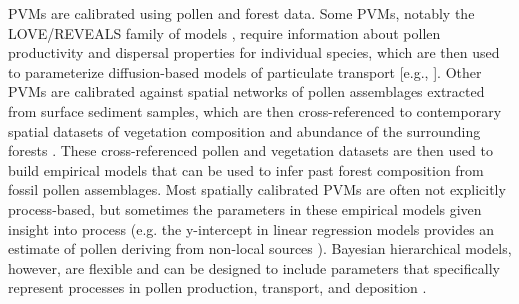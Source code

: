 \documentclass[12pt]{article}
\begin{document}


PVMs are calibrated using pollen and forest data. Some PVMs, notably
the LOVE/REVEALS family of models \citep{sugita2007theory1,
  sugita2007theory2}, require information about pollen productivity
and dispersal properties for individual species, which are then used
to parameterize diffusion-based models of particulate transport [e.g.,
  \citet{prentice1985pollen}]. Other PVMs are calibrated against
spatial networks of pollen assemblages extracted from surface sediment
samples, which are then cross-referenced to contemporary spatial
datasets of vegetation composition and abundance of the surrounding
forests \citep{sugita2007theory1, sugita2007theory2}. These
cross-referenced pollen and vegetation datasets are then used to build
empirical models that can be used to infer past forest composition
from fossil pollen assemblages. Most spatially calibrated PVMs are
often not explicitly process-based, but sometimes the parameters in
these empirical models given insight into process (e.g. the
y-intercept in linear regression models provides an estimate of pollen
deriving from non-local sources \citep{howe1983calibrating}).
Bayesian hierarchical models, however, are flexible and can be
designed to include parameters that specifically represent processes
in pollen production, transport, and deposition
\citep{paciorek2009mapping}.  
\end{document}
